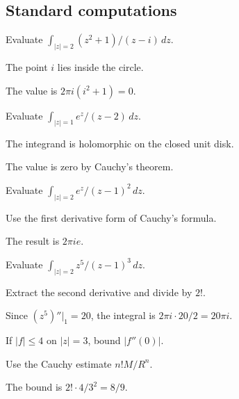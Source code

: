 \subsection*{Standard computations}

\begin{exercise}\label{exr:iv06-expand-01}
Evaluate \(\int_{|z|=2}(z^2+1)/(z-i)\,dz\).
\end{exercise}
\begin{hint}
The point \(i\) lies inside the circle.
\end{hint}
\begin{solution}
The value is \(2\pi i(i^2+1)=0\).
\end{solution}

\begin{exercise}\label{exr:iv06-expand-02}
Evaluate \(\int_{|z|=1} e^z/(z-2)\,dz\).
\end{exercise}
\begin{hint}
The integrand is holomorphic on the closed unit disk.
\end{hint}
\begin{solution}
The value is zero by Cauchy's theorem.
\end{solution}

\begin{exercise}\label{exr:iv06-expand-03}
Evaluate \(\int_{|z|=2} e^z/(z-1)^2\,dz\).
\end{exercise}
\begin{hint}
Use the first derivative form of Cauchy's formula.
\end{hint}
\begin{solution}
The result is \(2\pi i e\).
\end{solution}

\begin{exercise}\label{exr:iv06-expand-04}
Evaluate \(\int_{|z|=2} z^5/(z-1)^3\,dz\).
\end{exercise}
\begin{hint}
Extract the second derivative and divide by \(2!\).
\end{hint}
\begin{solution}
Since \((z^5)''|_{1}=20\), the integral is \(2\pi i\cdot20/2=20\pi i\).
\end{solution}

\begin{exercise}\label{exr:iv06-expand-05}
If \(|f|\le4\) on \(|z|=3\), bound \(|f''(0)|\).
\end{exercise}
\begin{hint}
Use the Cauchy estimate \(n!M/R^n\).
\end{hint}
\begin{solution}
The bound is \(2!\cdot4/3^2=8/9\).
\end{solution}

